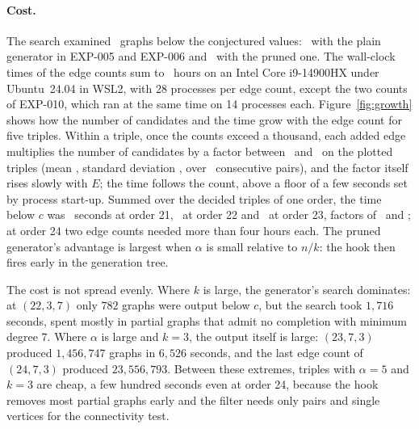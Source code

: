 \documentclass[11pt]{article}
\theoremstyle{definition}
\theoremstyle{remark}
\begin{document}


\paragraph{Cost.} The search examined \ngraphs\ graphs below the conjectured values: \ngraphsplain\ with the plain
generator in EXP-005 and EXP-006 and \ngraphspruned\ with the pruned one. The wall-clock times of the edge counts sum to \nhours\ hours on an
Intel Core i9-14900HX under Ubuntu~24.04 in WSL2, with 28 processes per edge count, except the two counts of EXP-010,
which ran at the same time on 14 processes each. Figure~\ref{fig:growth} shows how the number of
candidates and the time grow with the edge count for five triples. Within a triple, once the counts exceed a
thousand, each added edge multiplies the number of candidates by a factor between \growthlow\ and \growthhigh\ on
the plotted triples (mean \growthmean, standard deviation \growthsd, over \growthn\ consecutive pairs), and the factor itself rises slowly with $E$; the time follows the count, above a floor of a
few seconds set by process start-up. Summed over the decided triples of one order, the time below $c$ was
\secorderxxi\ seconds at order 21, \secorderxxii\ at order 22 and \secorderxxiii\ at order 23, factors of
\ratioxxii\ and \ratioxxiii; at order 24 two edge counts needed more than four hours each. The pruned generator's
advantage is largest when $\alpha$ is small relative to $n/k$: the hook then fires early in the generation tree.

The cost is not spread evenly. Where $k$ is large, the generator's search dominates: at $(22,3,7)$ only $782$ graphs
were output below $c$, but the search took $1{,}716$ seconds, spent mostly in partial graphs that admit no completion
with minimum degree $7$. Where $\alpha$ is large and $k=3$, the output itself is large: $(23,7,3)$ produced
$1{,}456{,}747$ graphs in $6{,}526$ seconds, and the last edge count of $(24,7,3)$ produced $23{,}556{,}793$. Between these
extremes, triples with $\alpha=5$ and $k=3$ are cheap, a few hundred seconds even at order 24, because the hook
removes most partial graphs early and the filter needs only pairs and single vertices for the connectivity test.
\end{document}

